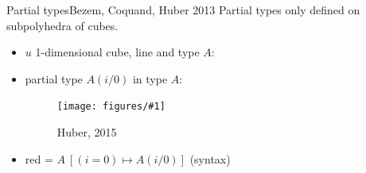 \documentclass[english,draft]{beamer}
\newcommand{\fig}[2]{
    \begin{figure}\begin{center}\texttt{[image: figures/\#1]}\caption{#2\label{#1}}\end{center}
    \end{figure}}
\begin{document}
\begin{frame}{Partial types}{Bezem, Coquand, Huber 2013}
 Partial types only defined on subpolyhedra of cubes.
 
\begin{itemize}
    \item $u$ 1-dimensional cube, line and type $A$:
    \item partial type $A(i/0)$ in type $A$:
            \fig{types_side}{Huber, 2015}
    \item red = $A\ [(i = 0) \mapsto A(i/0)]$ (syntax)
\end{itemize}

 
 
\end{frame}

  

  


  
 
\end{document}
